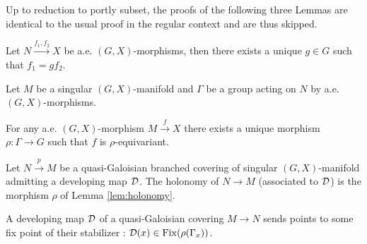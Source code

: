 

Up to reduction to portly subset, the proofs of the following three Lemmas are identical to the usual proof in the regular context and are thus skipped.  
\begin{lem}\label{lem:MtoXG}
  Let $N\xrightarrow{f_1,f_2} X$ be a.e.  $(G,X)$-morphisms,
then there exists a unique $g\in G$ such that $f_1=gf_2$.
\end{lem}

\begin{lem} \label{lem:holonomy} Let $M$ be a singular $(G,X)$-manifold and $\Gamma$ be a group acting on $N$ by a.e. $(G,X)$-morphisms. 

For any a.e. $(G,X)$-morphism $M\xrightarrow{f} X $  there exists a unique morphism $\rho:\Gamma\rightarrow G$ such that $f$ is $\rho$-equivariant.
\end{lem}
\begin{defi} 
 Let $N\xrightarrow{p} M$ be a quasi-Galoisian branched covering of singular $(G,X)$-manifold admitting a developing map $\mathcal{D}$. The holonomy of $N\rightarrow M$ (associated to $\mathcal{D}$) is the morphism $\rho$ of Lemma \ref{lem:holonomy}.
\end{defi}
 \begin{rem}
    A developing map $\mathcal{D}$ of a quasi-Galoisian covering $M\rightarrow N$ sends points to some fix point of their stabilizer : $\mathcal{D}(x) \in \mathrm{Fix}(\rho(\Gamma_x))$.
  \end{rem}
  
